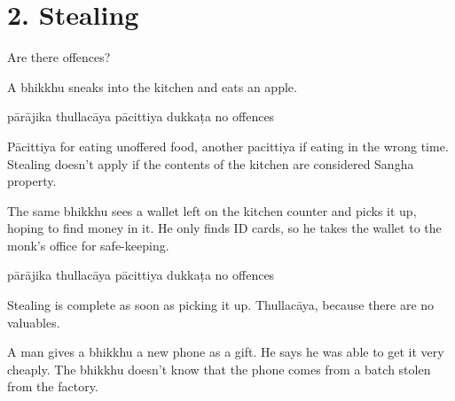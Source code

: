 \chapter{2. Stealing}
\renewcommand*{\theChapterTitle}{2. Stealing}

\begin{exam}{\autoExamName}

\begin{problem*}

  Are there offences?

\begin{parts}

  \item A bhikkhu sneaks into the kitchen and eats an apple.

  \bigskip

  \begin{answers}{5}
    \bChoices
     pārājika\eAns
     thullacāya\eAns
     pācittiya\eAns
     dukkaṭa\eAns
     no offences\eAns
    \eChoices
  \end{answers}

  \bigskip

  \begin{solution}
    Pācittiya for eating unoffered food, another pacittiya if eating in the
    wrong time. Stealing doesn't apply if the contents of the kitchen are
    considered Sangha property.
  \end{solution}

  \item The same bhikkhu sees a wallet left on the kitchen counter and picks it
    up, hoping to find money in it. He only finds ID cards, so he takes the wallet
    to the monk's office for safe-keeping.

  \bigskip

  \begin{answers}{5}
    \bChoices
     pārājika\eAns
     thullacāya\eAns
     pācittiya\eAns
     dukkaṭa\eAns
     no offences\eAns
    \eChoices
  \end{answers}

  \begin{solution}
    Stealing is complete as soon as picking it up. Thullacāya, because there are
    no valuables.
  \end{solution}

  \bigskip

  \item A man gives a bhikkhu a new phone as a gift. He says he was able to get it very cheaply.
  The bhikkhu doesn't know that the phone comes from a batch stolen from the factory. 


\end{parts}
\end{problem*}
\end{exam}
